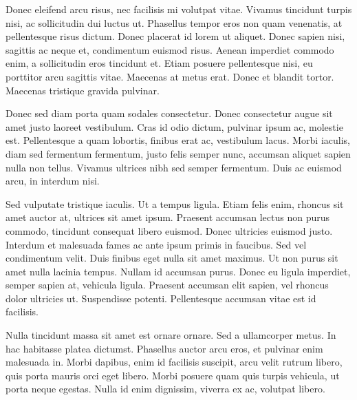 Donec eleifend arcu risus, nec facilisis mi volutpat vitae. Vivamus tincidunt turpis nisi, ac sollicitudin dui luctus ut. Phasellus tempor eros non quam venenatis, at pellentesque risus dictum. Donec placerat id lorem ut aliquet. Donec sapien nisi, sagittis ac neque et, condimentum euismod risus. Aenean imperdiet commodo enim, a sollicitudin eros tincidunt et. Etiam posuere pellentesque nisi, eu porttitor arcu sagittis vitae. Maecenas at metus erat. Donec et blandit tortor. Maecenas tristique gravida pulvinar.

Donec sed diam porta quam sodales consectetur. Donec consectetur augue sit amet justo laoreet vestibulum. Cras id odio dictum, pulvinar ipsum ac, molestie est. Pellentesque a quam lobortis, finibus erat ac, vestibulum lacus. Morbi iaculis, diam sed fermentum fermentum, justo felis semper nunc, accumsan aliquet sapien nulla non tellus. Vivamus ultrices nibh sed semper fermentum. Duis ac euismod arcu, in interdum nisi.

Sed vulputate tristique iaculis. Ut a tempus ligula. Etiam felis enim, rhoncus sit amet auctor at, ultrices sit amet ipsum. Praesent accumsan lectus non purus commodo, tincidunt consequat libero euismod. Donec ultricies euismod justo. Interdum et malesuada fames ac ante ipsum primis in faucibus. Sed vel condimentum velit. Duis finibus eget nulla sit amet maximus. Ut non purus sit amet nulla lacinia tempus. Nullam id accumsan purus. Donec eu ligula imperdiet, semper sapien at, vehicula ligula. Praesent accumsan elit sapien, vel rhoncus dolor ultricies ut. Suspendisse potenti. Pellentesque accumsan vitae est id facilisis.

Nulla tincidunt massa sit amet est ornare ornare. Sed a ullamcorper metus. In hac habitasse platea dictumst. Phasellus auctor arcu eros, et pulvinar enim malesuada in. Morbi dapibus, enim id facilisis suscipit, arcu velit rutrum libero, quis porta mauris orci eget libero. Morbi posuere quam quis turpis vehicula, ut porta neque egestas. Nulla id enim dignissim, viverra ex ac, volutpat libero.



\blankpage

\glsresetall



